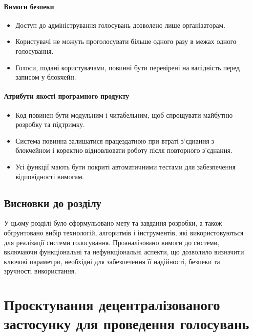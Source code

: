 \documentclass[14pt]{extreport}
\begin{document}
  \subsubsection{Вимоги безпеки}
  \begin{itemize}
    \item Доступ до адміністрування голосувань дозволено лише організаторам.
    \item Користувачі не можуть проголосувати більше одного разу в межах одного голосування.
    \item Голоси, подані користувачами, повинні бути перевірені на валідність перед записом у блокчейн.
  \end{itemize}
  
  \subsubsection{Атрибути якості програмного продукту}
  \begin{itemize}  
    \item Код повинен бути модульним і читабельним, щоб спрощувати майбутню розробку та підтримку.  
    \item Система повинна залишатися працездатною при втраті з'єднання з блокчейном і коректно відновлювати роботу після повторного з'єднання.
    \item Усі функції мають бути покриті автоматичними тестами для забезпечення відповідності вимогам.  
  \end{itemize}

 
  \section{Висновки до розділу}
  
  У цьому розділі було сформульовано мету та завдання розробки, а також обґрунтовано вибір технологій, алгоритмів і інструментів, які використовуються для реалізації системи голосування. Проаналізовано вимоги до системи, включаючи функціональні та нефункціональні аспекти, що дозволило визначити ключові параметри, необхідні для забезпечення її надійності, безпеки та зручності використання.

  \chapter{Проєктування децентралізованого застосунку для проведення голосувань}
\end{document}
